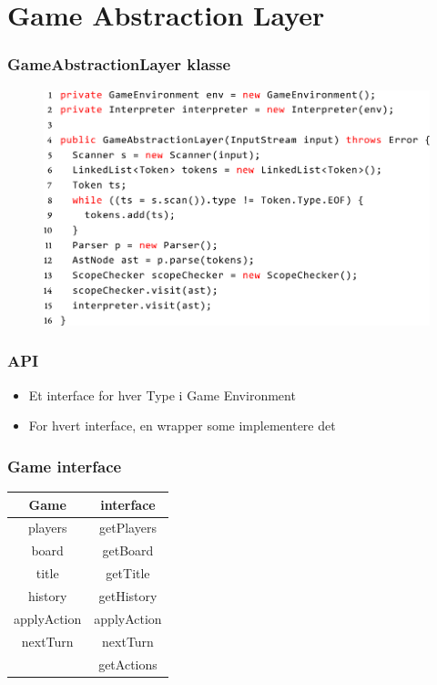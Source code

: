 \section{Game Abstraction Layer}


\begin{frame}
  \frametitle{GameAbstractionLayer klasse}

 	\begin{figure}
    	\includegraphics[width=0.8\linewidth]{billeder/gal_constructor_code.png}
 	\end{figure}
\end{frame}

\begin{frame}
  \frametitle{API}

  \begin{itemize}
    \item Et interface for hver Type i Game Environment
    \item For hvert interface, en wrapper some implementere det
  \end{itemize}
\end{frame}

\begin{frame}
  \frametitle{Game interface}

  \begin{tabular}{ c | c }
    Game & interface \\
    \hline
    players & getPlayers \\
    board & getBoard \\
    title & getTitle \\
    history & getHistory \\
    applyAction & applyAction \\
    nextTurn & nextTurn \\
     & getActions \\
  \end{tabular}
\end{frame}

